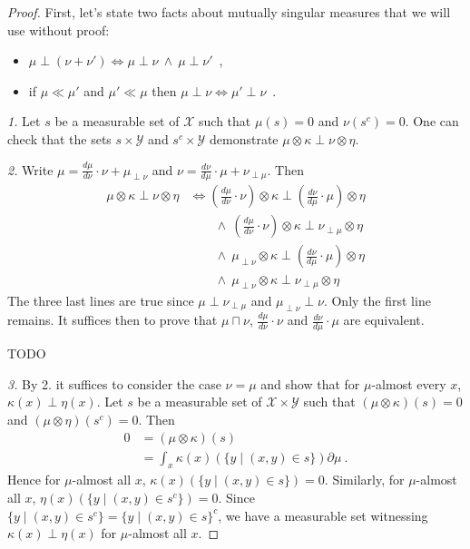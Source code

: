 \begin{proof}\mathlibok
\uses{}
First, let's state two facts about mutually singular measures that we will use without proof:
\begin{itemize}
  \item $\mu \perp (\nu + \nu') \iff \mu \perp \nu \ \wedge \ \mu \perp \nu'$~,
  \item if $\mu \ll \mu'$ and  $\mu' \ll \mu$ then $\mu \perp \nu \iff \mu' \perp \nu$~.
\end{itemize}

\emph{1.} Let $s$ be a measurable set of $\mathcal X$ such that $\mu(s) = 0$ and $\nu(s^c) = 0$. One can check that the sets $s \times \mathcal Y$ and $s^c \times \mathcal Y$ demonstrate $\mu \otimes \kappa \perp \nu \otimes \eta$.

\emph{2.} Write $\mu = \frac{d \mu}{d \nu} \cdot \nu + \mu_{\perp \nu}$ and $\nu = \frac{d \nu}{d \mu} \cdot \mu + \nu_{\perp \mu}$.
Then
\begin{align*}
\mu \otimes \kappa \perp \nu \otimes \eta
&\iff \left(\frac{d \mu}{d \nu} \cdot \nu\right) \otimes \kappa \perp \left(\frac{d \nu}{d \mu} \cdot \mu\right) \otimes \eta
\\&\qquad \wedge \ \left(\frac{d \mu}{d \nu} \cdot \nu\right) \otimes \kappa \perp \nu_{\perp \mu} \otimes \eta
\\&\qquad \wedge \ \mu_{\perp \nu} \otimes \kappa \perp \left(\frac{d \nu}{d \mu} \cdot \mu\right) \otimes \eta
\\&\qquad \wedge \ \mu_{\perp \nu} \otimes \kappa \perp \nu_{\perp \mu} \otimes \eta
\end{align*}
The three last lines are true since $\mu \perp \nu_{\perp \mu}$ and $\mu_{\perp \nu} \perp \nu$. Only the first line remains.
It suffices then to prove that $\mu \sqcap \nu$, $\frac{d \mu}{d \nu} \cdot \nu$ and $\frac{d \nu}{d \mu} \cdot \mu$ are equivalent.

TODO

\emph{3.} By 2. it suffices to consider the case $\nu = \mu$ and show that for $\mu$-almost every $x$, $\kappa(x) \perp \eta(x)$.
Let $s$ be a measurable set of $\mathcal X \times \mathcal Y$ such that $(\mu \otimes \kappa)(s) = 0$ and $(\mu \otimes \eta)(s^c) = 0$.
Then
\begin{align*}
0 &= (\mu \otimes \kappa)(s)
\\
&= \int_{x} \kappa(x)(\{y \mid (x, y) \in s\}) \partial \mu
\: .
\end{align*}
Hence for $\mu$-almost all $x$, $\kappa(x)(\{y \mid (x, y) \in s\}) = 0$. Similarly, for $\mu$-almost all $x$, $\eta(x)(\{y \mid (x, y) \in s^c\}) = 0$. Since $\{y \mid (x, y) \in s^c\} = \{y \mid (x, y) \in s\}^c$, we have a measurable set witnessing $\kappa(x) \perp \eta(x)$ for $\mu$-almost all $x$.
\end{proof}



